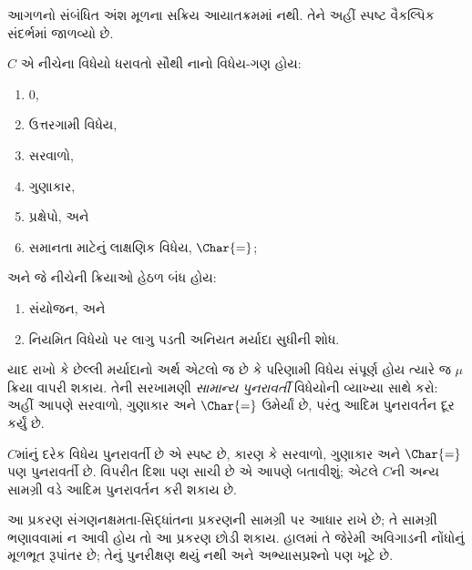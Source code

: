 \begin{editorial}
આગળનો સંબંધિત અંશ મૂળના સક્રિય આયાતક્રમમાં નથી. તેને અહીં સ્પષ્ટ વૈકલ્પિક સંદર્ભમાં જાળવ્યો છે.
\end{editorial}
\begingroup
\makeatletter{}\makeatother

\label{guunit:OLP-0648}


$C$ એ નીચેના વિધેયો ધરાવતો સૌથી નાનો વિધેય-ગણ હોય:
\begin{enumerate}
\item $0$,
\item ઉત્તરગામી વિધેય,
\item સરવાળો,
\item ગુણાકાર,
\item પ્રક્ષેપો, અને
\item સમાનતા માટેનું લાક્ષણિક વિધેય, $\Char{=}$;
\end{enumerate}
અને જે નીચેની ક્રિયાઓ હેઠળ બંધ હોય:
\begin{enumerate}
\item સંયોજન, અને
\item નિયમિત વિધેયો પર લાગુ પડતી અનિયત મર્યાદા સુધીની શોધ.
\end{enumerate}
યાદ રાખો કે છેલ્લી મર્યાદાનો અર્થ એટલો જ છે કે
પરિણામી વિધેય સંપૂર્ણ હોય ત્યારે જ $\mu$ ક્રિયા
વાપરી શકાય. તેની સરખામણી \emph{સામાન્ય પુનરાવર્તી}
વિધેયોની વ્યાખ્યા સાથે કરો: અહીં આપણે સરવાળો, ગુણાકાર
અને $\Char{=}$ ઉમેર્યાં છે, પરંતુ આદિમ પુનરાવર્તન
દૂર કર્યું છે.

$C$માંનું દરેક વિધેય પુનરાવર્તી છે એ સ્પષ્ટ છે,
કારણ કે સરવાળો, ગુણાકાર અને $\Char{=}$ પણ
પુનરાવર્તી છે. વિપરીત દિશા પણ સાચી છે એ આપણે
બતાવીશું; એટલે $C$ની અન્ય સામગ્રી વડે આદિમ
પુનરાવર્તન કરી શકાય છે.
\endgroup
\endgroup


\begingroup
\makeatletter{}\makeatother

\begin{editorial}
  આ પ્રકરણ સંગણનક્ષમતા-સિદ્ધાંતના
  પ્રકરણની સામગ્રી પર આધાર રાખે છે;
  તે સામગ્રી ભણાવવામાં ન આવી
  હોય તો આ પ્રકરણ છોડી શકાય.
  હાલમાં તે જેરેમી અવિગાડની
  નોંધોનું મૂળભૂત રૂપાંતર છે;
  તેનું પુનરીક્ષણ થયું નથી અને
  અભ્યાસપ્રશ્નો પણ ખૂટે છે.
\end{editorial}

\label{guunit:OLP-0301}


\begingroup
\makeatletter{}\makeatother

